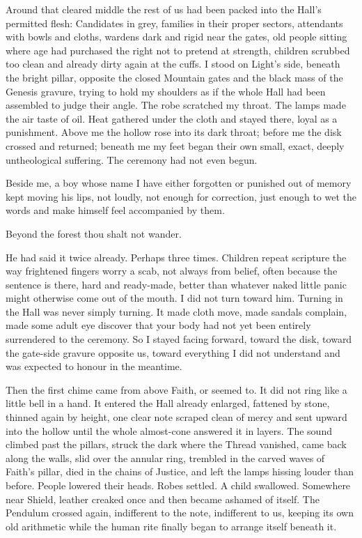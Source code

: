 Around that cleared middle the rest of us had been packed into the Hall’s permitted flesh: Candidates in grey, families in their proper sectors, 
attendants with bowls and cloths, wardens dark and rigid near the gates, old people sitting where age had purchased the right not to pretend at strength, 
children scrubbed too clean and already dirty again at the cuffs. 
I stood on Light’s side, beneath the bright pillar, opposite the closed Mountain gates and the black mass of the Genesis gravure, 
trying to hold my shoulders as if the whole Hall had been assembled to judge their angle. 
The robe scratched my throat. 
The lamps made the air taste of oil. 
Heat gathered under the cloth and stayed there, loyal as a punishment. 
Above me the hollow rose into its dark throat; before me the disk crossed and returned; beneath me my feet began their own small, exact, deeply untheological suffering. 
The ceremony had not even begun.\par


Beside me, a boy whose name I have either forgotten or punished out of memory kept moving his lips, not loudly, not enough for correction, 
just enough to wet the words and make himself feel accompanied by them. 

\begin{scripture}
Beyond the forest thou shalt not wander.
\end{scripture}

He had said it twice already. 
Perhaps three times. 
Children repeat scripture the way frightened fingers worry a scab, not always from belief, often because the sentence is there, 
hard and ready-made, better than whatever naked little panic might otherwise come out of the mouth. 
I did not turn toward him. 
Turning in the Hall was never simply turning. 
It made cloth move, made sandals complain, made some adult eye discover that your body had not yet been entirely surrendered to the ceremony. 
So I stayed facing forward, toward the disk, toward the gate-side gravure opposite us, toward everything I did not understand and was expected to honour in the meantime. \par

Then the first chime came from above Faith, or seemed to. 
It did not ring like a little bell in a hand. 
It entered the Hall already enlarged, fattened by stone, thinned again by height, one clear note scraped clean of mercy and sent upward into the hollow 
until the whole almost-cone answered it in layers. 
The sound climbed past the pillars, struck the dark where the Thread vanished, came back along the walls, slid over the annular ring, 
trembled in the carved waves of Faith’s pillar, died in the chains of Justice, and left the lamps hissing louder than before. 
People lowered their heads. 
Robes settled. 
A child swallowed. 
Somewhere near Shield, leather creaked once and then became ashamed of itself. 
The Pendulum crossed again, indifferent to the note, indifferent to us, keeping its own old arithmetic while the human rite finally began to arrange itself beneath it. \par

